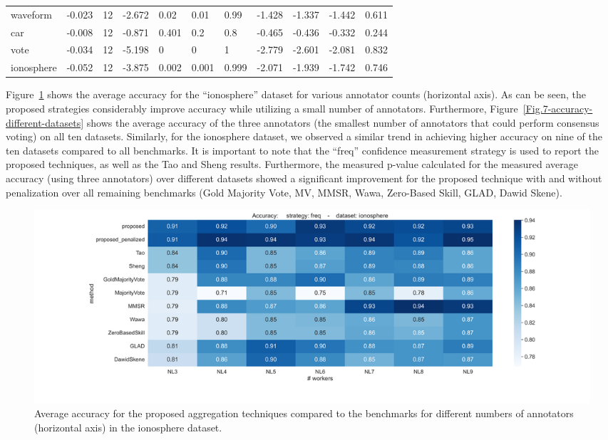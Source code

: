 \documentclass[pdflatex,bst/sn-basic]{bst/sn-jnl}%
\begin{document}
\begin{table}[]
{\begin{tabular}{lccclllccrc}
        waveform    & -0.023 & 12 & -2.672 & 0.02  & 0.01  & 0.99  & -1.428 & -1.337 & -1.442 & 0.611 \\
        car         & -0.008 & 12 & -0.871 & 0.401 & 0.2   & 0.8   & -0.465 & -0.436 & -0.332 & 0.244 \\
        vote        & -0.034 & 12 & -5.198 & 0     & 0     & 1     & -2.779 & -2.601 & -2.081 & 0.832 \\
        ionosphere  & -0.052 & 12 & -3.875 & 0.002 & 0.001 & 0.999 & -2.071 & -1.939 & -1.742 & 0.746 \\ \hline
    \end{tabular} }
    \label{crowd.Table.3.crowdcertain_vs_Tao.beta}
\end{table}

Figure~\ref{Fig.6-accuracy-different-n-annotators} shows the average accuracy for the ``ionosphere'' dataset for various annotator counts (horizontal axis). As can be seen, the proposed strategies considerably improve accuracy while utilizing a small number of annotators. Furthermore, Figure~\ref{Fig.7-accuracy-different-datasets} shows the average accuracy of the three annotators (the smallest number of annotators that could perform consensus voting) on all ten datasets. Similarly, for the ionosphere dataset, we observed a similar trend in achieving higher accuracy on nine of the ten datasets compared to all benchmarks. It is important to note that the ``freq'' confidence measurement strategy is used to report the proposed techniques, as well as the Tao and Sheng results. Furthermore, the measured p-value calculated for the measured average accuracy (using three annotators) over different datasets showed a significant improvement for the proposed technique with and without penalization over all remaining benchmarks (Gold Majority Vote, MV, MMSR, Wawa, Zero-Based Skill, GLAD, Dawid Skene).

\begin{figure}[!htbp]
    \centering
    \includegraphics[width=\textwidth]{figures/image9.png}
    \caption{{Average accuracy for the proposed aggregation techniques compared to the benchmarks for different numbers of annotators (horizontal axis) in the ionosphere dataset.}}
    \label{Fig.6-accuracy-different-n-annotators}
\end{figure}
\end{document}
